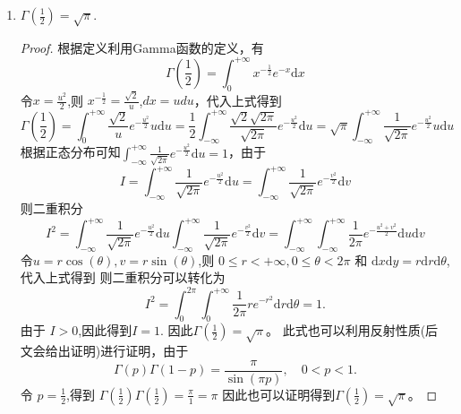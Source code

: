 \begin{property}
\begin{enumerate}[noitemsep]
		\item $ \displaystyle \Gamma \left(\frac{1}{2} \right)= \sqrt{\pi}.$
		\begin{proof}
			根据定义利用Gamma函数的定义，有
			$$\Gamma  \left(\frac{1}{2} \right) = \int_{0}^{\text{+}\infty }{x^{-\frac{1}{2}}e^{-x}\mathrm{d}x} $$令$\displaystyle x = \frac{u^2}{2}$,则 $ \displaystyle x^{-\frac{1}{2}} = \frac{\sqrt{2}}{u}$,$dx = udu$，代入上式得到
			$$ \Gamma  \left(\frac{1}{2} \right) = \int_{0}^{\text{+}\infty }\frac{\sqrt{2}}{u} e^{-\frac{u^2}{2}} u\mathrm{d}u = \frac{1}{2}\int_{-\infty}^{+\infty }\frac{\sqrt{2} \sqrt{2\pi}}{\sqrt{2\pi}} e^{-\frac{u^2}{2}} \mathrm{d}u = \sqrt{\pi} \int_{-\infty}^{+\infty }\frac{1}{\sqrt{2\pi}} e^{-\frac{u^2}{2}} u\mathrm{d}u$$
			根据正态分布可知$\displaystyle \int_{-\infty}^{+\infty }\frac{1}{\sqrt{2\pi}} e^{-\frac{u^2}{2}} \mathrm{d}u = 1$，由于
			$$ I = \int_{-\infty}^{+\infty }\frac{1}{\sqrt{2\pi}} e^{-\frac{u^2}{2}} \mathrm{d}u = \int_{-\infty}^{+\infty }\frac{1}{\sqrt{2\pi}} e^{-\frac{v^2}{2}} \mathrm{d}v$$
			则二重积分
			$$ I^2 = \int_{-\infty}^{+\infty }\frac{1}{\sqrt{2\pi}} e^{-\frac{u^2}{2}} \mathrm{d}u \int_{-\infty}^{+\infty }\frac{1}{\sqrt{2\pi}} e^{-\frac{v^2}{2}} \mathrm{d}v = \int_{-\infty}^{+\infty } \int_{-\infty}^{+\infty } \frac{1}{2\pi}  e^{-\frac{u^2+v^2}{2}}\mathrm{d}u \mathrm{d}v$$
			令$u = r\cos\left(\theta\right),v = r\sin\left(\theta\right)$,则 $0\le r<+\infty,0\le \theta <2\pi$ 和  $\mathrm{d}x\mathrm{d}y = r\mathrm{d}r\mathrm{d}\theta $,代入上式得到
			则二重积分可以转化为
			$$ I^2 = \int_{0}^{2\pi}\int_{0}^{+\infty } \frac{1}{2\pi}  re^{-r^2}\mathrm{d}r \mathrm{d}\theta = 1.$$
			由于 $I >0$,因此得到$ I = 1$.
			因此$\displaystyle \Gamma\left(\frac{1}{2}\right) = \sqrt{\pi}$。
			此式也可以利用反射性质(后文会给出证明)进行证明，由于
			$$\Gamma\left(p\right)\Gamma\left(1-p\right) = \frac{\pi}{\sin\left(\pi p\right)},\quad 0<p<1.$$
			令 $\displaystyle p = \frac{1}{2}$,得到 $\displaystyle \Gamma\left(\frac{1}{2}\right)\Gamma\left(\frac{1}{2}\right) = \frac{\pi}{1} = \pi$
			因此也可以证明得到$\displaystyle \Gamma\left(\frac{1}{2}\right) = \sqrt{\pi}$。
		\end{proof}
		

\end{enumerate}
\end{property}
